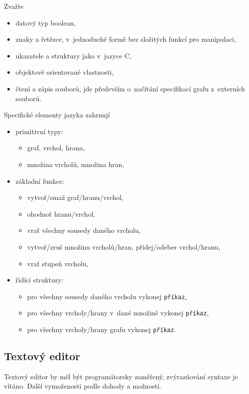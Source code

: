 \documentclass[11pt,twoside,a4paper]{book}
\begin{document}
Zvažte

\begin{itemize}
\item datový typ boolean,
\item znaky a řetězce, v~jednoduché formě bez složitých funkcí pro manipulaci,
\item ukazatele a struktury jako v~jazyce C,
\item objektově orientované vlastnosti,
\item čtení a zápis souborů, jde především o~načítání specifikací grafu z~externích souborů.
\end{itemize}

Specifické elementy jazyka zahrnují

\begin{itemize}
\item primitivní typy:
	\begin{itemize}
	\item graf, vrchol, hrana,
	\item množina vrcholů, množina hran,
	\end{itemize}
\item základní funkce:
	\begin{itemize}
	\item vytvoř/smaž graf/hranu/vrchol,
	\item ohodnoť hranu/vrchol,
	\item vrať všechny sousedy daného vrcholu,
	\item vytvoř/zruš množinu vrcholů/hran, přidej/odeber vrchol/hranu,
	\item vrať stupeň vrcholu,
	\end{itemize}
\item řídící struktury:
	\begin{itemize}
	\item pro všechny sousedy daného vrcholu vykonej \texttt{příkaz},
	\item pro všechny vrcholy/hrany v~dané množině vykonej \texttt{příkaz},
	\item pro všechny vrcholy/hrany grafu vykonej \texttt{příkaz}.
	\end{itemize}
\end{itemize}


\subsection{Textový editor}

Textový editor by měl být programátorsky zaměřený, zvýrazňování syntaxe je vítáno. Další vymoženosti podle dohody a možností.
\end{document}

